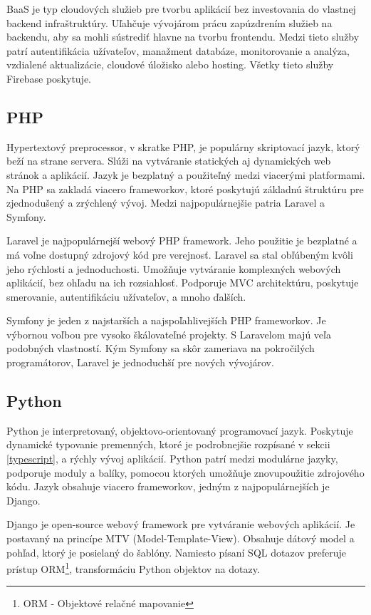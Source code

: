 BaaS je typ cloudových služieb pre tvorbu aplikácií bez investovania do vlastnej backend infraštruktúry. Uľahčuje vývojárom prácu zapúzdrením služieb na backendu, aby sa mohli sústrediť hlavne na tvorbu frontendu. Medzi tieto služby patrí autentifikácia užívateľov, manažment databáze, monitorovanie a analýza, vzdialené aktualizácie, cloudové úložisko alebo hosting. Všetky tieto služby Firebase poskytuje. 

\subsection{PHP}
Hypertextový preprocessor\cite{php}, v skratke PHP, je populárny skriptovací jazyk, ktorý beží na strane servera. Slúži na vytváranie statických aj dynamických web stránok a aplikácií. Jazyk je bezplatný a použiteľný medzi viacerými platformami. Na PHP sa zakladá viacero frameworkov, ktoré poskytujú základnú štruktúru pre zjednodušený a zrýchlený vývoj. Medzi najpopulárnejšie patria Laravel a Symfony.

Laravel je najpopulárnejší webový PHP framework. Jeho použitie je bezplatné a má voľne dostupný zdrojový kód pre verejnosť. Laravel sa stal obľúbeným kvôli jeho rýchlosti a jednoduchosti. Umožňuje vytváranie komplexných webových aplikácií, bez ohľadu na ich rozsiahlosť. Podporuje MVC architektúru, poskytuje smerovanie, autentifikáciu užívateľov, a mnoho ďalších\cite{php}.

Symfony je jeden z najstarších a najspoľahlivejších PHP frameworkov. Je výbornou voľbou pre vysoko škálovateľné projekty. S Laravelom majú veľa podobných vlastností. Kým Symfony sa skôr zameriava na pokročilých programátorov, Laravel je jednoduchší pre nových vývojárov\cite{php}.

\subsection{Python}
Python je interpretovaný, objektovo-orientovaný programovací jazyk\cite{python}. Poskytuje dynamické typovanie premenných, ktoré je podrobnejšie rozpísané v sekcii \ref{typescript}, a rýchly vývoj aplikácií. Python patrí medzi modulárne jazyky, podporuje moduly a balíky, pomocou ktorých umožňuje znovupoužitie zdrojového kódu. Jazyk obsahuje viacero frameworkov, jedným z najpopulárnejších je Django.

Django je open-source webový framework pre vytváranie webových aplikácií. Je postavaný na princípe MTV (Model-Template-View). Obsahuje dátový model a pohľad, ktorý je posielaný do šablóny. Namiesto písaní SQL dotazov preferuje prístup ORM\footnote{ORM - Objektové relačné mapovanie}, transformáciu Python objektov na dotazy.

